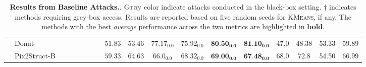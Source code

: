 \begin{table}[t]
\begin{center}
\begin{small}
\begin{adjustbox}{width=\textwidth}
\begin{tabular}{clcccccccccccccccc}
& {Donut} & \cellcolor[HTML]{C0C0C0}{$79.67$} & \cellcolor[HTML]{C0C0C0}{$79.53$} & \cellcolor[HTML]{C0C0C0}{$75.97_{0.07}$} & \cellcolor[HTML]{C0C0C0}{$79.57_{0.07}$} & \cellcolor[HTML]{C0C0C0}{$\textbf{80.50}_{\textbf{0.0}}$} & \cellcolor[HTML]{C0C0C0}{$\textbf{81.10}_{\textbf{0.0}}$} & $51.83$ & $53.46$ & $77.17_{0.0}$ & $75.92_{0.0}$ & $\textbf{80.50}_{\textbf{0.0}}$ & $\textbf{81.10}_{\textbf{0.0}}$ & 47.0 & 48.38 & 53.33 & 59.89
\\

& {Pix2Struct-B} & \cellcolor[HTML]{C0C0C0}{$67.33$} & \cellcolor[HTML]{C0C0C0}{$67.97$} & \cellcolor[HTML]{C0C0C0}{$\textbf{68.17}_{\textbf{0.0}}$} & \cellcolor[HTML]{C0C0C0}{$\textbf{71.36}_{\textbf{0.0}}$} & \cellcolor[HTML]{C0C0C0}{$69.13_{0.07}$} & \cellcolor[HTML]{C0C0C0}{$67.67_{0.09}$} & $59.33$ & $64.63$ & $66.0_{0.0}$ & $68.32_{0.0}$ & $\textbf{69.00}_{\textbf{0.0}}$ & $\textbf{67.48}_{\textbf{0.0}}$ & 68.0 & 72.8 & 54.50 & 66.99
\\
\bottomrule
\end{tabular}
\end{adjustbox}
\end{small}
\end{center}
\caption{\textbf{Results from Baseline Attacks.}. \textcolor{gray}{\textbf{Gray}} color indicate attacks conducted in the black-box setting. $\dagger$ indicates methods requiring grey-box access. Results are reported based on five random seeds for \textsc{KMeans}, if any. The methods with the best \textit{average} performance across the two metrics are highlighted in \textbf{bold}.}
\vspace{-0.2in}
\label{tab:baseline_updated_results}
\end{table}
